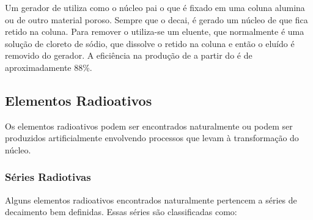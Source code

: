 \documentclass[11pt,a4paper]{article}
\begin{document}
    Um gerador de  utiliza como o núcleo pai o  que é fixado em uma coluna alumina ou de outro material poroso. Sempre que o  decai, é gerado um núcleo de  que fica retido na coluna. Para remover o  utiliza-se um eluente, que normalmente é uma solução de cloreto de sódio, que dissolve o  retido na coluna e então o  eluído é removido do gerador. A eficiência na produção de  a partir do  é de aproximadamente 88\%.
             
\subsection*{Elementos Radioativos}
            
    Os elementos radioativos podem ser encontrados naturalmente ou podem ser produzidos artificialmente envolvendo processos que levam à transformação do núcleo.

\subsubsection*{Séries Radiotivas}

	Alguns elementos radioativos encontrados naturalmente pertencem a séries de decaimento bem definidas. Essas séries são classificadas como:
\end{document}
